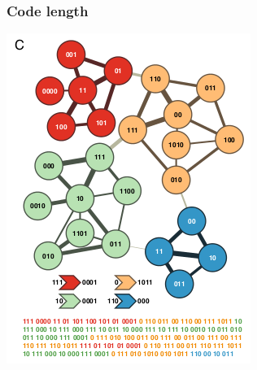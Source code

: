 \documentclass{beamer}
\begin{document}
\begin{frame}
  \frametitle{Code length}
  \begin{center}
    \includegraphics[height=0.8\textheight,width=\textwidth,keepaspectratio=true]{figure/map3}

    \tiny{}
  \end{center}
\end{frame}
\end{document}
